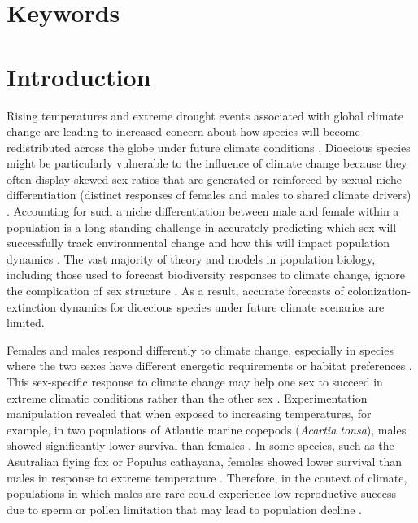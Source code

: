 \documentclass[11pt]{article}
\begin{document}
\section*{Keywords}

\newpage
\section*{Introduction}
Rising temperatures and extreme drought events associated with global climate change are leading to increased concern about how species will become redistributed across the globe under future climate conditions \citep{bertrand2011changes,gamelon2017interactions}.
Dioecious species might be particularly vulnerable to the influence of climate change because they often display skewed sex ratios that are generated or reinforced by sexual niche differentiation (distinct responses of females and males to shared climate drivers) \citep{Tognetti2012}. 
Accounting for such a niche differentiation between male and female within a population is a long-standing challenge in accurately predicting which sex will successfully track environmental change and how this will impact population dynamics \citep{jones1999sex,gissi2023exploring}. 
The vast majority of theory and models in population biology, including those used to forecast biodiversity responses to climate change, ignore the complication of sex structure \citep{pottier2021sexual,ellis2017does}.
As a result, accurate forecasts of colonization-extinction dynamics for dioecious species under future climate scenarios are limited. 

Females and males respond differently to climate change, especially in species where the two sexes have different energetic requirements or habitat preferences \citep{gissi2023exploring,gissi2023sex,hultine2016climate}. 
This sex-specific response to climate change may help one sex to succeed in extreme climatic conditions rather than the other sex \citep{zhao2012sex, burli2022environmental}.
Experimentation manipulation revealed that when exposed to increasing temperatures, for example, in two populations of Atlantic marine copepods (\textit{Acartia tonsa}), males showed significantly lower survival than females \citep{sasaki2019complex}. 
In some species, such as the Asutralian flying fox or Populus cathayana, females showed lower survival than males in response to extreme temperature \citep{welbergen2008climate,zhao2012sex}.
Therefore, in the context of climate, populations in which males are rare could experience low reproductive success due to sperm or pollen limitation that may lead to population decline \citep{eberhart2017sex}.
\end{document}
